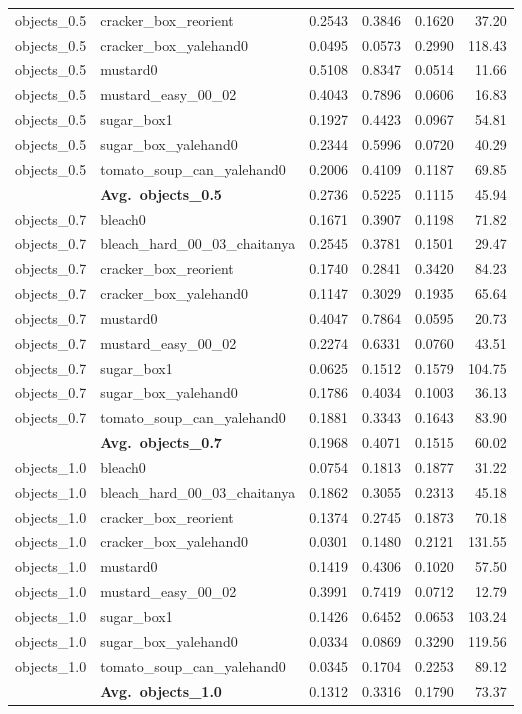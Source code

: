 \begin{longtable}{llrrrr}
  objects_0.5 & cracker\_box\_reorient & 0.2543 & 0.3846 & 0.1620 & 37.20 \\
  objects_0.5 & cracker\_box\_yalehand0 & 0.0495 & 0.0573 & 0.2990 & 118.43 \\
  objects_0.5 & mustard0 & 0.5108 & 0.8347 & 0.0514 & 11.66 \\
  objects_0.5 & mustard\_easy\_00\_02 & 0.4043 & 0.7896 & 0.0606 & 16.83 \\
  objects_0.5 & sugar\_box1 & 0.1927 & 0.4423 & 0.0967 & 54.81 \\
  objects_0.5 & sugar\_box\_yalehand0 & 0.2344 & 0.5996 & 0.0720 & 40.29 \\
  objects_0.5 & tomato\_soup\_can\_yalehand0 & 0.2006 & 0.4109 & 0.1187 & 69.85 \\
  \cmidrule{2-6}
  & \textbf{Avg.~objects_0.5} & 0.2736 & 0.5225 & 0.1115 & 45.94 \\
  \midrule
  objects_0.7 & bleach0 & 0.1671 & 0.3907 & 0.1198 & 71.82 \\
  objects_0.7 & bleach\_hard\_00\_03\_chaitanya & 0.2545 & 0.3781 & 0.1501 & 29.47 \\
  objects_0.7 & cracker\_box\_reorient & 0.1740 & 0.2841 & 0.3420 & 84.23 \\
  objects_0.7 & cracker\_box\_yalehand0 & 0.1147 & 0.3029 & 0.1935 & 65.64 \\
  objects_0.7 & mustard0 & 0.4047 & 0.7864 & 0.0595 & 20.73 \\
  objects_0.7 & mustard\_easy\_00\_02 & 0.2274 & 0.6331 & 0.0760 & 43.51 \\
  objects_0.7 & sugar\_box1 & 0.0625 & 0.1512 & 0.1579 & 104.75 \\
  objects_0.7 & sugar\_box\_yalehand0 & 0.1786 & 0.4034 & 0.1003 & 36.13 \\
  objects_0.7 & tomato\_soup\_can\_yalehand0 & 0.1881 & 0.3343 & 0.1643 & 83.90 \\
  \cmidrule{2-6}
  & \textbf{Avg.~objects_0.7} & 0.1968 & 0.4071 & 0.1515 & 60.02 \\
  \midrule
  objects_1.0 & bleach0 & 0.0754 & 0.1813 & 0.1877 & 31.22 \\
  objects_1.0 & bleach\_hard\_00\_03\_chaitanya & 0.1862 & 0.3055 & 0.2313 & 45.18 \\
  objects_1.0 & cracker\_box\_reorient & 0.1374 & 0.2745 & 0.1873 & 70.18 \\
  objects_1.0 & cracker\_box\_yalehand0 & 0.0301 & 0.1480 & 0.2121 & 131.55 \\
  objects_1.0 & mustard0 & 0.1419 & 0.4306 & 0.1020 & 57.50 \\
  objects_1.0 & mustard\_easy\_00\_02 & 0.3991 & 0.7419 & 0.0712 & 12.79 \\
  objects_1.0 & sugar\_box1 & 0.1426 & 0.6452 & 0.0653 & 103.24 \\
  objects_1.0 & sugar\_box\_yalehand0 & 0.0334 & 0.0869 & 0.3290 & 119.56 \\
  objects_1.0 & tomato\_soup\_can\_yalehand0 & 0.0345 & 0.1704 & 0.2253 & 89.12 \\
  \cmidrule{2-6}
  & \textbf{Avg.~objects_1.0} & 0.1312 & 0.3316 & 0.1790 & 73.37 \\
  \midrule
\bottomrule
\end{longtable}